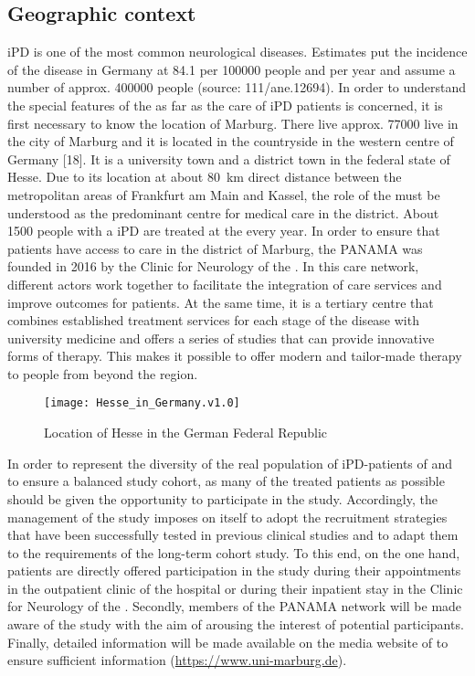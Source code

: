 \subsection{Geographic context}
\ac{iPD} is one of the most common neurological diseases. Estimates put the incidence of the disease in Germany at \SI{84.1}{} per \SI{100000}{} people and per year and assume a number of approx. \SI{400000}{} people (source: 111/ane.12694). In order to understand the special features of the \UKGM as far as the care of \ac{iPD} patients is concerned, it is first necessary to know the location of Marburg. There live approx. \SI{77000}{} live in the city of Marburg and it is located in the countryside in the western centre of Germany [18]. It is a university town and a district town in the federal state of Hesse. Due to its location at about \SI{80}{\km} direct distance between the metropolitan areas of Frankfurt am Main and Kassel, the role of the \UKGM must be understood as the predominant centre for medical care in the district. About \SI{1500}{} people with a \ac{iPD} are treated at the \UKGM every year. In order to ensure that patients have access to care in the district of Marburg, the \ac{PANAMA} was founded in 2016 by the Clinic for Neurology of the \UKGM. In this care network, different actors work together to facilitate the integration of care services and improve outcomes for patients. At the same time, it is a tertiary centre that combines established treatment services for each stage of the disease with university medicine and offers a series of studies that can provide innovative forms of therapy. This makes it possible to offer modern and tailor-made therapy to people from beyond the region.

\begin{wrapfigure}{r}{0.45\textwidth} %
    \label{fig1:hesseGermany}
    \centering
    \texttt{[image: Hesse\_in\_Germany.v1.0]}
    \caption{Location of Hesse in the German Federal Republic}
\end{wrapfigure}

In order to represent the diversity of the real population of \ac{iPD}-patients of \UKGM and to ensure a balanced study cohort, as many of the treated patients as possible should be given the opportunity to participate in the study. Accordingly, the management of the study imposes on itself to adopt the recruitment strategies that have been successfully tested in previous clinical studies and to adapt them to the requirements of the long-term cohort study. To this end, on the one hand, patients are directly offered participation in the study during their appointments in the outpatient clinic of the hospital or during their inpatient stay in the Clinic for Neurology of the \UKGM. Secondly, members of the \ac{PANAMA} network will be made aware of the study with the aim of arousing the interest of potential participants. Finally, detailed information will be made available on the media website of \UKGM to ensure sufficient information (\url{https://www.uni-marburg.de}).

